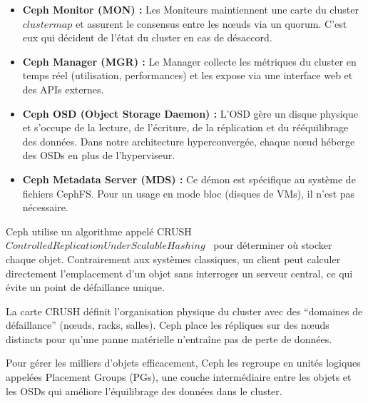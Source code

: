 \begin{itemize}

    \item \textbf{Ceph Monitor (MON) :} Les Moniteurs maintiennent une carte du cluster \(cluster map\) et assurent le consensus entre les n\oe{}uds via un quorum. C'est eux qui décident de l'état du cluster en cas de désaccord.

    \item \textbf{Ceph Manager (MGR) :} Le Manager collecte les métriques du cluster en temps réel (utilisation, performances) et les expose via une interface web et des APIs externes.

    \item \textbf{Ceph OSD (Object Storage Daemon) :} L'OSD gère un disque physique et s'occupe de la lecture, de l'écriture, de la réplication et du rééquilibrage des données. Dans notre architecture hyperconvergée, chaque n\oe{}ud héberge des OSDs en plus de l'hyperviseur.

    \item \textbf{Ceph Metadata Server (MDS) :} Ce démon est spécifique au système de fichiers CephFS. Pour un usage en mode bloc (disques de VMs), il n'est pas nécessaire.

\end{itemize}


\par Ceph utilise un algorithme appelé CRUSH \(Controlled Replication Under Scalable Hashing\)~\cite{ref28} pour déterminer où stocker chaque objet. Contrairement aux systèmes classiques, un client peut calculer directement l'emplacement d'un objet sans interroger un serveur central, ce qui évite un point de défaillance unique.\\

\par La carte CRUSH définit l'organisation physique du cluster avec des ``domaines de défaillance'' (n\oe{}uds, racks, salles). Ceph place les répliques sur des n\oe{}uds distincts pour qu'une panne matérielle n'entraîne pas de perte de données.\\

\par Pour gérer les milliers d'objets efficacement, Ceph les regroupe en unités logiques appelées Placement Groups (PGs), une couche intermédiaire entre les objets et les OSDs qui améliore l'équilibrage des données dans le cluster.\\

